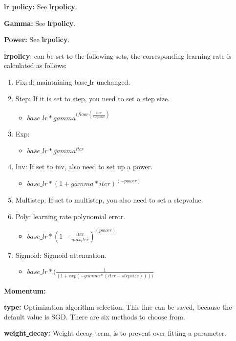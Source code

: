 \documentclass[12pt]{article}
\begin{document}
\noindent\textbf{lr\underline{{ }{ }}policy: } See \textbf{lrpolicy}.

\noindent\textbf{Gamma: } See \textbf{lrpolicy}.

\noindent\textbf{Power: } See \textbf{lrpolicy}.

\noindent \textbf{lrpolicy}: can be set to the following sets, the corresponding learning rate is calculated as follows:

\begin{enumerate}
  \item Fixed: maintaining base\underline{{ }{ }}lr unchanged.
  \item Step: If it is set to step, you need to set a step size.
  \begin{itemize}
    \item $base\_lr * gamma ^ {(floor (\frac{iter}{stepsize})}$
  \end{itemize}
  \item Exp:
  \begin{itemize}
    \item $base\_lr * gamma ^ {iter}$
  \end{itemize}
  \item Inv: If set to inv, also need to set up a power.
  \begin{itemize}
    \item $base\_lr * (1 + gamma * iter) ^ {(- power)}$
  \end{itemize}
  \item Multistep: If set to multistep, you also need to set a stepvalue.
  \item Poly: learning rate polynomial error.
  \begin{itemize}
    \item $base\_lr *(1 - \frac{iter}{max_iter}) ^ {(power)}$
  \end{itemize}
  \item Sigmoid: Sigmoid attenuation.
  \begin{itemize}
    \item $base\_lr *(\frac{1} { (1 + exp (-gamma * (iter - stepsize))))}$
  \end{itemize}
\end{enumerate}

\noindent\textbf{Momentum:}

\noindent\textbf{type:} Optimization algorithm selection. This line can be saved, because the default value is SGD. There are six methods to choose from.

\noindent\textbf{weight\underline{{ }{ }}decay: } Weight decay term, is to prevent over fitting a parameter.
\end{document}
